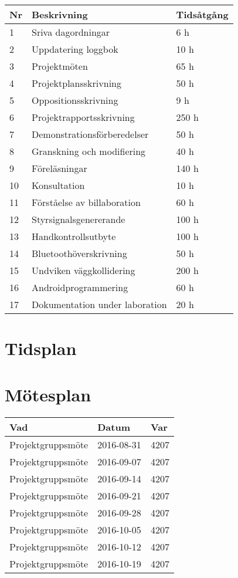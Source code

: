 \documentclass[a4paper]{article}
\begin{document}
\begin{tabular}{|l|l|l|} \hline
\bf Nr & \bf Beskrivning                & \bf Tidsåtgång \\ \hline \hline
1      & Sriva dagordningar             & 6   h \\ \hline
2      & Uppdatering loggbok            & 10  h \\ \hline
3      & Projektmöten                   & 65  h \\ \hline
4      & Projektplansskrivning          & 50  h \\ \hline
5      & Oppositionsskrivning           & 9   h \\ \hline
6      & Projektrapportsskrivning       & 250 h \\ \hline
7      & Demonstrationsförberedelser    & 50  h \\ \hline
8      & Granskning och modifiering     & 40  h \\ \hline
9      & Föreläsningar                  & 140 h \\ \hline
10     & Konsultation                   & 10  h \\ \hline 
11     & Förståelse av billaboration    & 60  h \\ \hline
12     & Styrsignalsgenererande         & 100 h \\ \hline
13     & Handkontrollsutbyte            & 100 h \\ \hline
14     & Bluetoothöverskrivning         & 50  h \\ \hline
15     & Undviken väggkollidering       & 200 h \\ \hline
16     & Androidprogrammering           & 60  h \\ \hline 
17     & Dokumentation under laboration & 20  h \\ \hline
\end{tabular}

\section{Tidsplan}

\section{Mötesplan}

\begin{tabular}{|l|l|l|} \hline
\bf Vad           & \bf Datum  & \bf Var \\ \hline \hline
Projektgruppsmöte & 2016-08-31 &    4207 \\ \hline
Projektgruppsmöte & 2016-09-07 &    4207 \\ \hline
Projektgruppsmöte & 2016-09-14 &    4207 \\ \hline
Projektgruppsmöte & 2016-09-21 &    4207 \\ \hline
Projektgruppsmöte & 2016-09-28 &    4207 \\ \hline
Projektgruppsmöte & 2016-10-05 &    4207 \\ \hline
Projektgruppsmöte & 2016-10-12 &    4207 \\ \hline
Projektgruppsmöte & 2016-10-19 &    4207 \\ \hline
\end{tabular}
\end{document}
